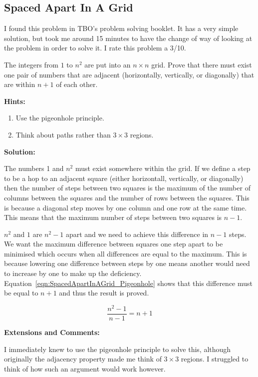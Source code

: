 \subsection{Spaced Apart In A Grid}

I found this problem in TBO's problem solving booklet. It has a very simple solution, but took me around 15 minutes to have the change of way of looking at the problem in order to solve it. I rate this problem a 3/10.

The integers from $1$ to $n^2$ are put into an $n \times n$ grid. Prove that there must exist one pair of numbers that are adjacent (horizontally, vertically, or diagonally) that are within $n + 1$ of each other.

\textbf{Hints:}

\begin{enumerate}
	\item Use the pigeonhole principle.
	\item Think about paths rather than $3 \times 3$ regions.
\end{enumerate}

\textbf{Solution:}

The numbers 1 and $n^2$ must exist somewhere within the grid. If we define a step to be a hop to an adjacent square (either horizontall, vertically, or diagonally) then the number of steps between two squares is the maximum of the number of columns between the squares and the number of rows between the squares. This is because a diagonal step moves by one column and one row at the same time. This means that the maximum number of steps between two squares is $n - 1$.

$n^2$ and $1$ are $n^2 - 1$ apart and we need to achieve this difference in $n - 1$ steps. We want the maximum difference between squares one step apart to be minimised which occurs when all differences are equal to the maximum. This is because lowering one difference between steps by one means another would need to increase by one to make up the deficiency. Equation~\ref{eqn:SpacedApartInAGrid_Pigeonhole} shows that this difference must be equal to $n + 1$ and thus the result is proved.

\begin{equation}
	\frac{n^2 - 1}{n - 1} = {n + 1}
	\label{eqn:SpacedApartInAGrid_Pigeonhole}
\end{equation}

\textbf{Extensions and Comments:}

I immediately knew to use the pigeonhole principle to solve this, although originally the adjacency property made me think of $3 \times 3$ regions. I struggled to think of how such an argument would work however.

